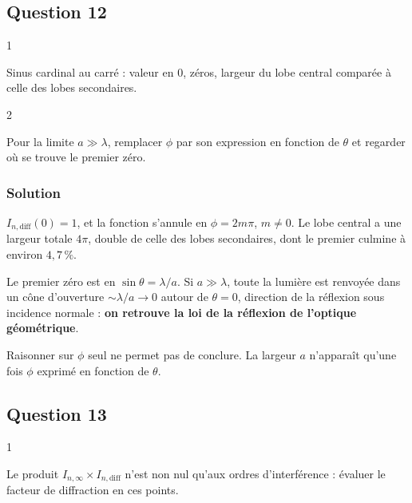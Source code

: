 \documentclass[11pt,a4paper]{article}
\begin{document}
\hypertarget{question-12}{%
\subsection{Question 12}\label{question-12}}

\begin{indication}{1}

Sinus cardinal au carré : valeur en 0, zéros, largeur du lobe central comparée à celle des lobes secondaires.

\end{indication}

\begin{indication}{2}

Pour la limite \(a\gg\lambda\), remplacer \(\phi\) par son expression en fonction de \(\theta\) et regarder où se trouve le premier zéro.

\end{indication}

\hypertarget{solution-11}{%
\subsubsection{Solution}\label{solution-11}}

\(I_{n,\text{diff}}(0) = 1\), et la fonction s'annule en \(\phi = 2m\pi\), \(m\neq0\). Le lobe central a une largeur totale \(4\pi\), double de celle des lobes secondaires, dont le premier culmine à environ \(4{,}7\,\%\).

Le premier zéro est en \(\sin\theta = \lambda/a\). Si \(a\gg\lambda\), toute la lumière est renvoyée dans un cône d'ouverture \(\sim\lambda/a\to0\) autour de \(\theta = 0\), direction de la réflexion sous incidence normale : \textbf{on retrouve la loi de la réflexion de l'optique géométrique}.

\begin{piege}

Raisonner sur \(\phi\) seul ne permet pas de conclure. La largeur \(a\) n'apparaît qu'une fois \(\phi\) exprimé en fonction de \(\theta\).

\end{piege}

\hypertarget{question-13}{%
\subsection{Question 13}\label{question-13}}

\begin{indication}{1}

Le produit \(I_{n,\infty}\times I_{n,\text{diff}}\) n'est non nul qu'aux ordres d'interférence : évaluer le facteur de diffraction en ces points.

\end{indication}
\end{document}
